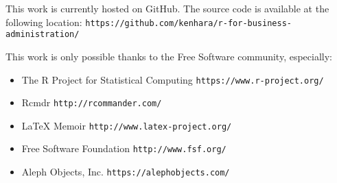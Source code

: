 %
%
%
%
%

\setlength{\parindent}{0pt}
This work is currently hosted on GitHub. The source code is available at the following location: \texttt{https://github.com/kenhara/r-for-business-administration/}

This work is only possible thanks to the Free Software community, especially:

\begin{itemize}
 \item The R Project for Statistical Computing \texttt{https://www.r-project.org/}
 \item Rcmdr \texttt{http://rcommander.com/}
 \item {\LaTeX} Memoir \texttt{http://www.latex-project.org/}
 \item Free Software Foundation \texttt{http://www.fsf.org/}
 \item Aleph Objects, Inc. \texttt{https://alephobjects.com/}
\end{itemize}